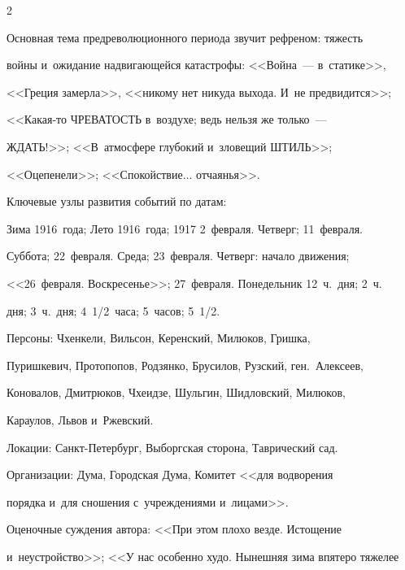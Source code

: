 \begin{multicols}{2}
     


     Основная тема предреволюционного периода звучит рефреном: тяжесть 


войны и~ожидание надвигающейся катастрофы: <<Война~--- в~статике>>, 


<<Греция замерла>>, <<никому нет никуда выхода. И~не предвидится>>; 


<<Ка\-кая-то ЧРЕВАТОСТЬ в~воздухе; ведь нельзя же только~--- 


ЖДАТЬ!>>; <<В~атмосфере глубокий и~зловещий ШТИЛЬ>>; 


<<Оцепенели>>; <<Спокойствие$\ldots$ отчаянья>>.


     


     Ключевые узлы развития событий по датам:


     


     Зима 1916~года; Лето 1916~года; 1917 2~февраля. Четверг; 11~февраля. 


Суббота; 22~февраля. Среда; 23~февраля. Четверг: начало движения; 


<<26~февраля. Воскресенье>>; 27~февраля. Понедельник 12~ч.\ дня; 2~ч.\ 


дня; 3~ч.\ дня; 4~1/2~часа; 5~часов; 5~1/2.


     


     Персоны: Чхенкели, Вильсон, Керенский, Милюков, Гришка, 


Пуришкевич, Протопопов, Род\-зян\-ко, Брусилов, Рузский, ген.\ Алексеев, 


Коновалов, Дмитрюков, Чхеидзе, Шульгин, Шидловский, Милюков, 


Караулов, Львов и~Ржевский.


     


     Локации: Санкт-Петербург, Выборгская сторона, Таврический сад.


     


     Организации: Дума, Городская Дума, Комитет <<для водворения 


порядка и~для сношения с~учреж\-де\-ни\-ями и~лицами>>.


     


     Оценочные суждения автора: <<При этом плохо везде. Истощение 


и~неустройство>>; <<У нас особенно худо. Нынешняя зима впятеро тяжелее 



\end{multicols}
